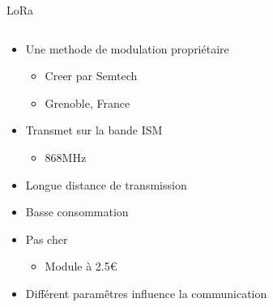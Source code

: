 \begin{frame}{LoRa}
\begin{columns}
\begin{column}{0.6\textwidth}
  \begin{itemize}
    \item Une methode de modulation propriétaire
    \begin{itemize}
      \item Creer par Semtech
      \item Grenoble, France
    \end{itemize}
    \item Transmet sur la bande ISM
    \begin{itemize}
      \item 868MHz
    \end{itemize}
    \item Longue distance de transmission
    \item Basse consommation
    \item Pas cher
    \begin{itemize}
      \item Module à 2.5€
    \end{itemize}
    \item Différent paramêtres influence la communication
  \end{itemize}
  \end{column}
  \begin{column}{0.4\textwidth}
  \end{column}
\end{columns}
\end{frame}


